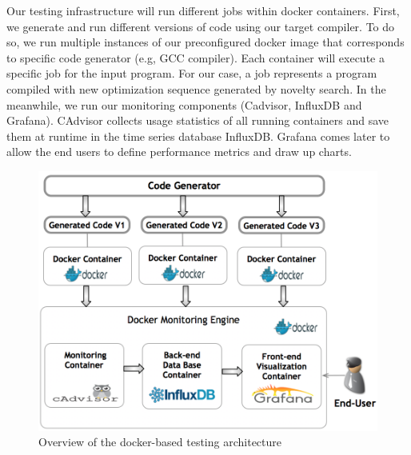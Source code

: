Our testing infrastructure will run different jobs within docker containers. First, we generate and run different versions of code using our target compiler. To do so, we run multiple instances of our preconfigured docker image that corresponds to specific code generator (e.g, GCC compiler). Each container will execute a specific job for the input program. For our case, a job represents a program compiled with new optimization sequence generated by novelty search. In the meanwhile, we run our monitoring components (Cadvisor, InfluxDB and Grafana). CAdvisor collects usage statistics of all running containers and save them at runtime in the time series database InfluxDB. Grafana comes later to allow the end users to define performance metrics and draw up charts.
\begin{figure}[h]
	\centering
	\includegraphics[scale=0.50]{Ressources/infra.png}
	\caption{Overview of the docker-based testing architecture}
\end{figure}